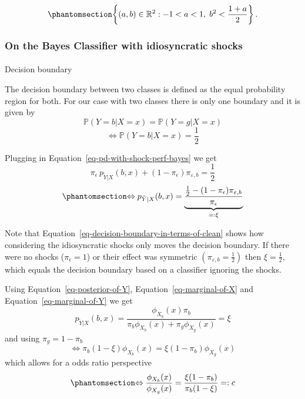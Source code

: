 \documentclass[
  12pt,
]{article}
\makeatletter
\let\oldparagraph\paragraph
\renewcommand{\paragraph}{
    \@ifstar
      \xxxParagraphStar
      \xxxParagraphNoStar
  }
\newcommand{\xxxParagraphStar}[1]{\oldparagraph*{#1}\mbox{}}
\newcommand{\xxxParagraphNoStar}[1]{\oldparagraph{#1}\mbox{}}
\makeatother
\begin{document}
\begin{equation}\protect\phantomsection\label{eq-positive-definite-region}{
\left\{
(a,b)\in\mathbb{R}^2 :
-1<a<1,\;
b^2<\frac{1+a}{2}
\right\}.
}\end{equation}

\subsubsection{On the Bayes Classifier with idiosyncratic
shocks}\label{on-the-bayes-classifier-with-idiosyncratic-shocks}

\paragraph{Decision
boundary}\label{sec-dec-boundary-perf-bayes-idyiosincratic-shocks}

The decision boundary between two classes is defined as the equal
probability region for both. For our case with two classes there is only
one boundary and it is given by \[
\mathbb{P}(Y=b | X=x) = \mathbb{P}(Y=g | X=x)
\] \[
\Leftrightarrow \mathbb{P}(Y=b | X=x) = \frac{1}{2}
\]

Plugging in Equation~\ref{eq-pd-with-shock-perf-bayes} we get \[
\pi_{\epsilon} \, p_{\tilde{Y} | X} (b, x) + (1 - \pi_{\epsilon}) \pi_{\varepsilon, b}
= \frac{1}{2}
\]
\begin{equation}\protect\phantomsection\label{eq-decision-boundary-in-terms-of-clean}{
\Leftrightarrow p_{\tilde{Y} | X} (b, x) = \underbrace{\frac{\frac{1}{2} - (1 - \pi_{\epsilon}) \pi_{\varepsilon, b}}{\pi_{\epsilon}}}_{=: \xi}
}\end{equation}

Note that Equation~\ref{eq-decision-boundary-in-terms-of-clean} shows
how considering the idiosyncratic shocks only moves the decision
boundary. If there were no shocks (\(\pi_\epsilon = 1\)) or their effect
was symmetric \(\left(\pi_{\varepsilon, b} = \frac{1}{2} \right)\) then
\(\xi = \frac{1}{2}\), which equals the decision boundary based on a
classifier ignoring the shocks.

Using Equation~\ref{eq-posterior-of-Y}, Equation~\ref{eq-marginal-of-X}
and Equation~\ref{eq-marginal-of-Y} we get \[
p_{\tilde{Y} | X} (b, x) = \frac{\phi_{X_b}(x) \pi_b}{\pi_b \phi_{X_b}(x) + \pi_g \phi_{X_g}(x)} = \xi
\] and using \(\pi_g = 1 - \pi_b\) \[
\Leftrightarrow  \pi_b(1 - \xi)\phi_{X_b}(x) = \xi (1 - \pi_b) \phi_{X_g}(x)
\] which allows for a odds ratio perspective
\begin{equation}\protect\phantomsection\label{eq-odds-ratio-shock}{
\Leftrightarrow \frac{\phi_{X_b}(x)}{\phi_{X_g}(x)} = \frac{\xi (1 - \pi_b)}{\pi_b(1 - \xi)} =: c
}\end{equation}
\end{document}
